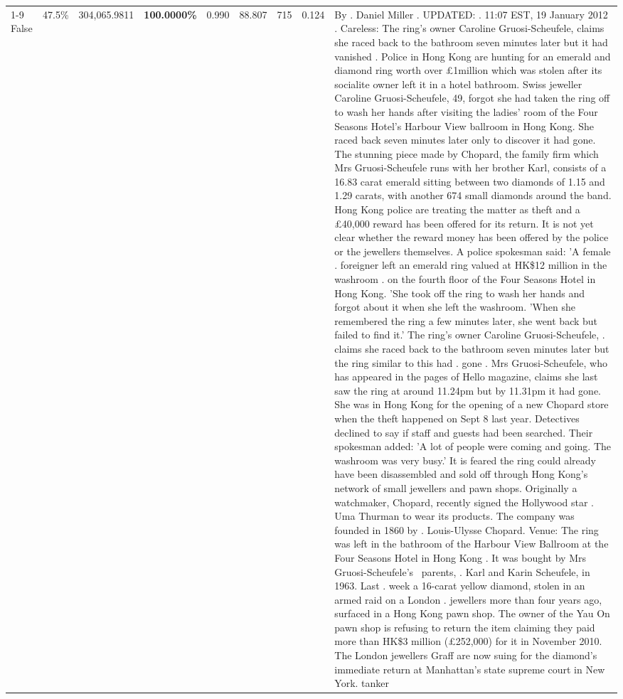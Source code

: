 \begin{table}[H]
\begin{tabular}{lllrlllll}
\cline{1-9} \cline{2-9}
False & 47.5\% & \color{red} 304,065.9811 & \bfseries \color{red} 100.0000\% & 0.990 & 88.807 & 715 & 0.124 & By . Daniel Miller . UPDATED: . 11:07 EST, 19 January 2012 . Careless: The ring's owner Caroline Gruosi-Scheufele, claims she raced back to the bathroom seven minutes later but it had vanished . Police in Hong Kong are hunting for an emerald and diamond ring worth over £1million which was stolen after its socialite owner left it in a hotel bathroom. Swiss jeweller Caroline Gruosi-Scheufele, 49, forgot she had taken the ring off to wash her hands after visiting the ladies' room of the Four Seasons Hotel's Harbour View ballroom in Hong Kong. She raced back seven minutes later only to discover it had gone. The stunning piece made by Chopard, the family firm which Mrs Gruosi-Scheufele runs with her brother Karl, consists of a 16.83 carat emerald sitting between two diamonds of 1.15 and 1.29 carats, with another 674 small diamonds around the band. Hong Kong police are treating the matter as theft and a £40,000 reward has been offered for its return. It is not yet clear whether the reward money has been offered by the police or the jewellers themselves. A police spokesman said: 'A female . foreigner left an emerald ring valued at HK\$12 million in the washroom . on the fourth floor of the Four Seasons Hotel in Hong Kong. 'She took off the ring to wash her hands and forgot about it when she left the washroom. 'When she remembered the ring a few minutes later, she went back but failed to find it.' The ring's owner Caroline Gruosi-Scheufele, . claims she raced back to the bathroom seven minutes later but the ring similar to this had . gone . Mrs Gruosi-Scheufele, who has appeared in the pages of Hello magazine, claims she last saw the ring at around 11.24pm but by 11.31pm it had gone. She was in Hong Kong for the opening of a new Chopard store when the theft happened on Sept 8 last year. Detectives declined to say if staff and guests had been searched. Their spokesman added: 'A lot of people were coming and going. The washroom was very busy.' It is feared the ring could already have been disassembled and sold off through Hong Kong's network of small jewellers and pawn shops. Originally a watchmaker, Chopard, recently signed the Hollywood star . Uma Thurman to wear its products. The company was founded in 1860 by . Louis-Ulysse Chopard. Venue: The ring was left in the bathroom of the Harbour View Ballroom at the Four Seasons Hotel in Hong Kong . It was bought by Mrs Gruosi-Scheufele's  parents, . Karl and Karin Scheufele, in 1963. Last . week a 16-carat yellow diamond, stolen in an armed raid on a London . jewellers more than four years ago, surfaced in a Hong Kong pawn shop. The owner of the Yau On pawn shop is refusing to return the item claiming they paid more than HK\$3 million (£252,000) for it in November 2010. The London jewellers Graff are now suing for the diamond’s immediate return at Manhattan’s state supreme court in New York. tanker \\

\end{tabular}
\end{table}
